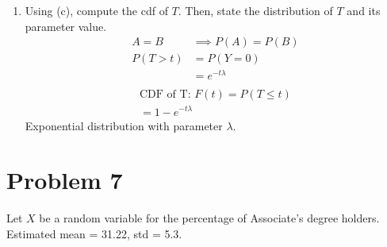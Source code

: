 \documentclass{article}
\begin{document}
\begin{enumerate}[label=\alph*)]
\begin{description}
          \end{description}
    \item Using (c), compute the cdf of \(T\). Then, state the distribution of \(T\) and its parameter value.
          \begin{align*}
              A = B    & \implies P(A) = P(B) \\
              P(T > t) & =  P(Y = 0)          \\
                       & = e^{-t\lambda}      \\
          \end{align*}
          \begin{align*}
              \text{CDF of T: } F(t) =  P(T \leq t) \\
              = 1 - e^{-t\lambda}
          \end{align*}
          Exponential distribution with parameter \(\lambda\).
\end{enumerate}

\pagebreak

\section*{Problem 7}
Let \(X\) be a random variable for the percentage of Associate's degree holders. \\
Estimated mean = 31.22, std = 5.3.
\end{document}

